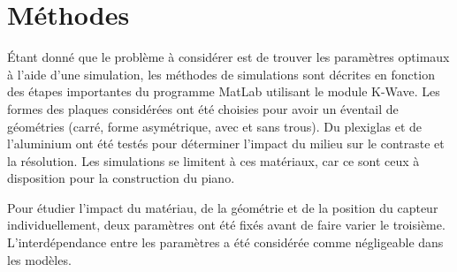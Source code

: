\documentclass[conference]{IEEEtran}
\begin{document}
\section{Méthodes \label{methodes}}


Étant donné que le problème à considérer est de trouver les paramètres 
optimaux à l'aide d'une simulation, les méthodes de simulations sont décrites
en fonction des étapes importantes du programme MatLab utilisant le module K-Wave. %
Les formes des plaques considérées ont été choisies pour avoir un éventail de 
géométries (carré, forme asymétrique, avec et sans trous). Du plexiglas et de 
l'aluminium ont été testés pour déterminer l'impact du milieu sur le contraste et la résolution. 
Les simulations se limitent à ces matériaux, car ce sont ceux à disposition 
pour la construction du piano.

Pour étudier l'impact du matériau, de la géométrie et de la position du capteur
individuellement, deux paramètres ont été fixés avant de faire varier le troisième. 
L'interdépendance entre les paramètres a été considérée comme négligeable dans 
les modèles.
\end{document}
